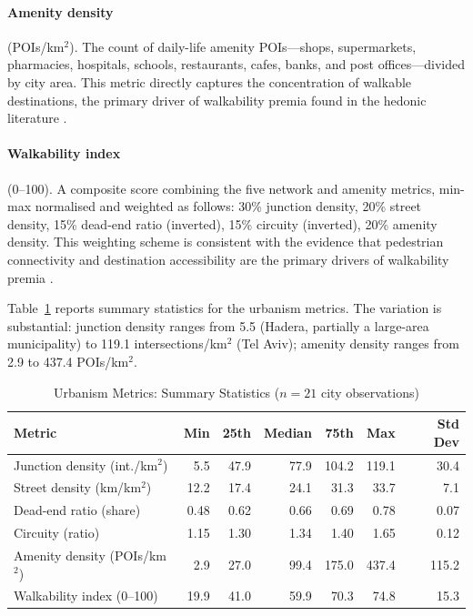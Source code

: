 \documentclass[12pt,a4paper]{article}
\begin{document}
\paragraph{Amenity density} (POIs/km$^2$).  The count of daily-life amenity
POIs—shops, supermarkets, pharmacies, hospitals, schools, restaurants, cafes,
banks, and post offices—divided by city area.  This metric directly captures
the concentration of walkable destinations, the primary driver of walkability
premia found in the hedonic literature \citep{pivo2011}.

\paragraph{Walkability index} (0--100).  A composite score combining the five
network and amenity metrics, min-max normalised and weighted as follows:
30\% junction density, 20\% street density, 15\% dead-end ratio (inverted),
15\% circuity (inverted), 20\% amenity density.  This weighting scheme is
consistent with the evidence that pedestrian connectivity and destination
accessibility are the primary drivers of walkability premia
\citep{bartholomew2011,pivo2011}.

Table~\ref{tab:urbanism} reports summary statistics for the urbanism metrics.
The variation is substantial: junction density ranges from 5.5 (Hadera,
partially a large-area municipality) to 119.1 intersections/km$^2$ (Tel Aviv);
amenity density ranges from 2.9 to 437.4 POIs/km$^2$.

\begin{table}[H]
\centering
\caption{Urbanism Metrics: Summary Statistics ($n=21$ city observations)}
\label{tab:urbanism}
\small
\begin{tabular}{lrrrrrr}
\toprule
Metric & Min & 25th & Median & 75th & Max & Std Dev \\
\midrule
Junction density (int./km$^2$)     &   5.5 &  47.9 &  77.9 & 104.2 & 119.1 & 30.4 \\
Street density (km/km$^2$)         &  12.2 &  17.4 &  24.1 &  31.3 &  33.7 &  7.1 \\
Dead-end ratio (share)             &  0.48 &  0.62 &  0.66 &  0.69 &  0.78 &  0.07 \\
Circuity (ratio)                   &  1.15 &  1.30 &  1.34 &  1.40 &  1.65 &  0.12 \\
Amenity density (POIs/km$^2$)      &   2.9 &  27.0 &  99.4 & 175.0 & 437.4 & 115.2 \\
Walkability index (0--100)         &  19.9 &  41.0 &  59.9 &  70.3 &  74.8 & 15.3 \\
\bottomrule
\end{tabular}
\end{table}
\end{document}
